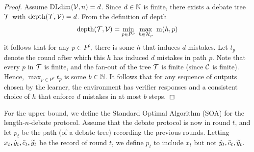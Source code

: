 \documentclass[anon]{alt2027} %
\begin{document}
\begin{proof}
Assume $\mathrm{DLdim}({\mathcal V}, n) = d$. 
Since $d\in\mathbb{N}$ is finite, there exists a debate tree ${\mathcal T}$ with $\mathrm{depth}({\mathcal T},{\mathcal V}) = d$. 
From the definition of depth
\[
\mathrm{depth}({\mathcal T},{\mathcal V}) =  \min_{p\in P^\rho}~  \max_{h\in {{\mathcal H}}_p}~ \mathrm{m}(h, p)
\]
it follows that for any $p \in P^\rho$, there is some $h$ that induces $d$ mistakes. Let $t_p$ denote the round after which this $h$ has induced $d$ mistakes in path $p$. Note that every $p$ in ${\mathcal T}$ is finite, and the fan-out of the tree ${\mathcal T}$ is finite (since ${{\mathcal C}}$ is finite). Hence, 
$\max_{p\in P^\rho} t_p$ is some $b \in \mathbb{N}$. 
It follows that for any sequence of outputs chosen by the learner, the environment has verifier responses and a consistent choice of $h$ that enforce $d$ mistakes in at most $b$ steps. 
\end{proof}

For the upper bound, we define the Standard Optimal Algorithm (SOA) for the length-$n$-debate protocol. Assume that the debate protocol is now in round $t$, and let $p_t$ be the path (of a debate tree) recording the previous rounds. Letting $x_t,{\hat{y}}_t,\bar{c}_t,{\widetilde{y}}_t$ be the record of round $t$, we define $p_t$ to include $x_t$ but not ${\hat{y}}_t,\bar{c}_t,{\widetilde{y}}_t$.
\end{document}
